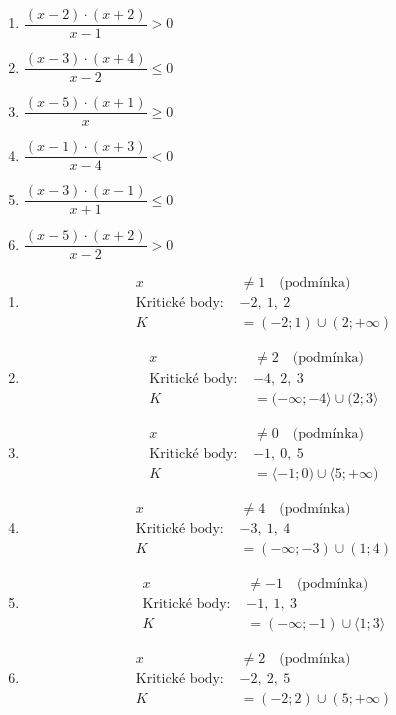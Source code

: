 \documentclass[11pt,a4paper]{article}
\begin{document}
\begin{zadaniReseniBox}[title={Rozšíření 2}]
\begin{enumerate}[label=\alph*),itemsep=2pt]
\item $\dfrac{\left(x - 2\right) \cdot \left(x + 2\right)}{x - 1}>0$
\item $\dfrac{\left(x - 3\right) \cdot \left(x + 4\right)}{x - 2}\le0$
\item $\dfrac{\left(x - 5\right) \cdot \left(x + 1\right)}{x}\ge0$
\item $\dfrac{\left(x - 1\right) \cdot \left(x + 3\right)}{x - 4}<0$
\item $\dfrac{\left(x - 3\right) \cdot \left(x - 1\right)}{x + 1}\le0$
\item $\dfrac{\left(x - 5\right) \cdot \left(x + 2\right)}{x - 2}>0$
\end{enumerate}
\tcblower
\begin{enumerate}[label=\alph*),itemsep=2pt]
\item
\[\begin{aligned}
x&\ne 1\quad\text{(podmínka)}\\[2pt]
\text{Kritické body: }&-2,\ 1,\ 2\\[2pt]
K&=(-2;1)\cup(2;+\infty)
\end{aligned}\]
\item
\[\begin{aligned}
x&\ne 2\quad\text{(podmínka)}\\[2pt]
\text{Kritické body: }&-4,\ 2,\ 3\\[2pt]
K&=(-\infty;-4\rangle\cup(2;3\rangle
\end{aligned}\]
\item
\[\begin{aligned}
x&\ne 0\quad\text{(podmínka)}\\[2pt]
\text{Kritické body: }&-1,\ 0,\ 5\\[2pt]
K&=\langle-1;0)\cup\langle5;+\infty)
\end{aligned}\]
\item
\[\begin{aligned}
x&\ne 4\quad\text{(podmínka)}\\[2pt]
\text{Kritické body: }&-3,\ 1,\ 4\\[2pt]
K&=(-\infty;-3)\cup(1;4)
\end{aligned}\]
\item
\[\begin{aligned}
x&\ne -1\quad\text{(podmínka)}\\[2pt]
\text{Kritické body: }&-1,\ 1,\ 3\\[2pt]
K&=(-\infty;-1)\cup\langle1;3\rangle
\end{aligned}\]
\item
\[\begin{aligned}
x&\ne 2\quad\text{(podmínka)}\\[2pt]
\text{Kritické body: }&-2,\ 2,\ 5\\[2pt]
K&=(-2;2)\cup(5;+\infty)
\end{aligned}\]
\end{enumerate}
\end{zadaniReseniBox}
\end{document}
